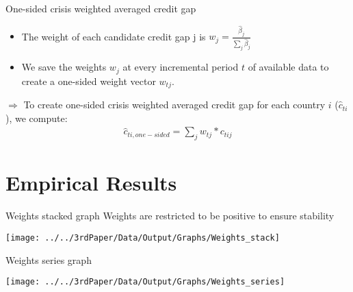 \documentclass[
  ignorenonframetext,
]{beamer}
\begin{document}
\begin{frame}{One-sided crisis weighted averaged credit gap}
\protect\hypertarget{one-sided-crisis-weighted-averaged-credit-gap}{}
\begin{itemize}
\item
  The weight of each candidate credit gap j is
  \(w_j = \frac{\hat{\beta}_j}{\sum\nolimits_j\hat{\beta}_j}\)
\item
  We save the weights \(w_j\) at every incremental period \(t\) of
  available data to create a one-sided weight vector \(w_{tj}\).
\end{itemize}

\(\Rightarrow\) To create one-sided crisis weighted averaged credit gap
for each country \(i\) (\(\hat{c}_{ti}\)), we compute: \begin{align}
\hat{c}_{ti,one-sided} = \sum\nolimits_{j} w_{tj} * c_{tij}
\end{align}
\end{frame}

\hypertarget{empirical-results-3}{%
\section{Empirical Results}\label{empirical-results-3}}

\begin{frame}{Weights stacked graph}
\protect\hypertarget{weights-stacked-graph}{}
Weights are restricted to be positive to ensure stability

\begin{center}\texttt{[image: ../../3rdPaper/Data/Output/Graphs/Weights\_stack]} \end{center}
\end{frame}

\begin{frame}{Weights series graph}
\protect\hypertarget{weights-series-graph}{}
\begin{center}\texttt{[image: ../../3rdPaper/Data/Output/Graphs/Weights\_series]} \end{center}
\end{frame}
\end{document}
